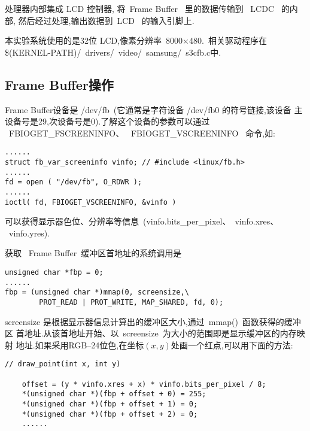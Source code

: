 	处理器内部集成 LCD 控制器, 将~Frame Buffer~ 里的数据传输到 ~LCDC~ 的内部,
然后经过处理,输出数据到~LCD~ 的输入引脚上.

	本实验系统使用的是32位 LCD,像素分辨率~8000$\times$480.~相关驱动程序在
\$(KERNEL-PATH)/~drivers/~video/~samsung/~s3cfb.c中.

\subsection{Frame Buffer操作}
	Frame Buffer设备是 /dev/fb~(它通常是字符设备 /dev/fb0 的符号链接,该设备
主设备号是29,次设备号是0).了解这个设备的参数可以通过 ~FBIOGET\_FSCREENINFO、
~FBIOGET\_VSCREENINFO~ 命令,如:

\begin{boxedminipage}{.9\textwidth}
\begin{verbatim}
......
struct fb_var_screeninfo vinfo; // #include <linux/fb.h>
......
fd = open ( "/dev/fb", O_RDWR );
......
ioctl( fd, FBIOGET_VSCREENINFO, &vinfo )
\end{verbatim}
\end{boxedminipage}

可以获得显示器色位、分辨率等信息~(vinfo.bits\_per\_pixel、~vinfo.xres、
~vinfo.yres).

获取 ~Frame Buffer~缓冲区首地址的系统调用是

\begin{boxedminipage}{.9\textwidth}
\begin{verbatim}
unsigned char *fbp = 0;
......
fbp = (unsigned char *)mmap(0, screensize,\
        PROT_READ | PROT_WRITE, MAP_SHARED, fd, 0);
\end{verbatim}
\end{boxedminipage}

screensize 是根据显示器信息计算出的缓冲区大小,通过~mmap()~函数获得的缓冲区
首地址.从该首地址开始、以~screensize~为大小的范围即是显示缓冲区的内存映射
地址.如果采用RGB--24位色,在坐标$(x, y)$处画一个红点,可以用下面的方法:

\begin{boxedminipage}{.9\textwidth}
\begin{verbatim}
// draw_point(int x, int y)

    offset = (y * vinfo.xres + x) * vinfo.bits_per_pixel / 8;
    *(unsigned char *)(fbp + offset + 0) = 255;
    *(unsigned char *)(fbp + offset + 1) = 0;
    *(unsigned char *)(fbp + offset + 2) = 0;
    ......
\end{verbatim}
\end{boxedminipage}

